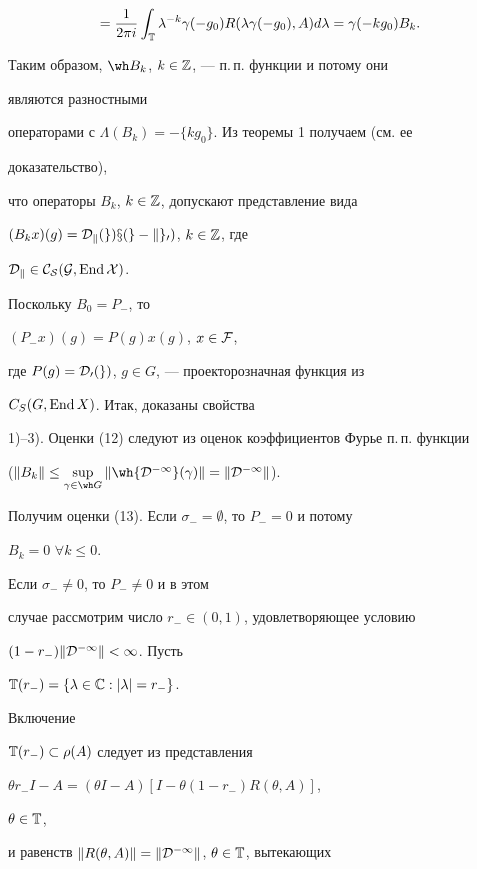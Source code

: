 \begin{pf}
\begin{gather*}
=\frac{1}{2\pi i}\int_{\Bbb T}\lambda^{-k}\gamma(-g_0) 


R(\lambda\gamma(-g_0),A)d\lambda=\gamma(-kg_0)B_k. 


\end{gather*} 


Таким образом, $\wh B_k$, $k\in\Bbb Z$, --- п.\,п. функции и потому они 


являются разностными 


операторами с $\Lambda(B_k)=-\{kg_0\}$. Из теоремы 1 получаем (см. ее 


доказательство), 


что операторы $B_k$, $k\in\Bbb Z$, допускают представление вида 


$(B_kx)(g)=\cal D_k(g)x(g-kg_0)$, $k\in\Bbb Z$, где 


$\cal D_k\in C_S(G,\operatorname{End} X)$. 


Поскольку $B_0=P_-$, то 


$(P_-x)(g)=P(g)x(g)$, $x\in\cal F$, 


где $P(g)=\cal D_0(g)$, $g\in G$, --- проекторозначная функция из 


$C_S(G,\operatorname{End} X)$. Итак, доказаны свойства 


1)--3). Оценки (12) следуют из оценок коэффициентов Фурье п.\,п. функции 


($\|B_k\|\le\sup\limits_{\gamma\in\wh G} 


\|\wh{\cal D^{-1}}(\gamma)\|=\|\cal D^{-1}\|$). 


 


Получим оценки (13). Если $\sigma_-=\emptyset$, то $P_-=0$ и потому 


$B_k=0$ $\forall k\le 0$. 


Если $\sigma_-\ne 0$, то $P_-\ne 0$ и в этом 


случае рассмотрим число $r_-\in(0,1)$, удовлетворяющее условию 


$(1-r_-)\|\cal D^{-1}\|<1$. Пусть 


$\Bbb T(r_-)=\{\lambda\in\Bbb C:|\lambda|=r_-\}$. 


Включение 


$\Bbb T(r_-)\subset\rho(A)$ следует из представления 


$\theta r_-I-A=(\theta I-A)[I-\theta(1-r_-)R(\theta,A)]$, 


$\theta\in\Bbb T$, 


и равенств $\|R(\theta,A)\|=\|\cal D^{-1}\|$, $\theta\in\Bbb T$, вытекающих 



\end{pf}
